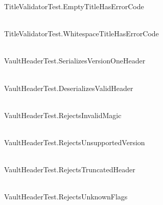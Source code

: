 \begin{DoxyRefList}
\label{test__test000028}%
%
Title\+Validator\+Test.\+Empty\+Title\+Has\+Error\+Code  
\item[{\parbox[t]{\linewidth}{Member \doxylink{_validation_error_test_8cpp_aa2a87c6ca1c63f442dc169d5cdd9415a}{TEST} (Title\+Validator\+Test, Whitespace\+Title\+Has\+Error\+Code)}}]\hfill \\
\label{test__test000029}%
%
Title\+Validator\+Test.\+Whitespace\+Title\+Has\+Error\+Code  
\item[{\parbox[t]{\linewidth}{Member \doxylink{_vault_header_test_8cpp_a066a86e7251b44f3d0ca70fdd046a58a}{TEST} (Vault\+Header\+Test, Serializes\+Version\+One\+Header)}}]\hfill \\
\label{test__test000030}%
%
Vault\+Header\+Test.\+Serializes\+Version\+One\+Header  
\item[{\parbox[t]{\linewidth}{Member \doxylink{_vault_header_test_8cpp_a98f85a77e3f67e42075fa7940898a537}{TEST} (Vault\+Header\+Test, Deserializes\+Valid\+Header)}}]\hfill \\
\label{test__test000031}%
%
Vault\+Header\+Test.\+Deserializes\+Valid\+Header  
\item[{\parbox[t]{\linewidth}{Member \doxylink{_vault_header_test_8cpp_a7e25d12c59dc37adc670d0658acc3b3f}{TEST} (Vault\+Header\+Test, Rejects\+Invalid\+Magic)}}]\hfill \\
\label{test__test000032}%
%
Vault\+Header\+Test.\+Rejects\+Invalid\+Magic  
\item[{\parbox[t]{\linewidth}{Member \doxylink{_vault_header_test_8cpp_a090221df618a7c0c7b2cacbb9aee4c56}{TEST} (Vault\+Header\+Test, Rejects\+Unsupported\+Version)}}]\hfill \\
\label{test__test000033}%
%
Vault\+Header\+Test.\+Rejects\+Unsupported\+Version  
\item[{\parbox[t]{\linewidth}{Member \doxylink{_vault_header_test_8cpp_a69d8aaa75875ef23884c67ba61339e60}{TEST} (Vault\+Header\+Test, Rejects\+Truncated\+Header)}}]\hfill \\
\label{test__test000034}%
%
Vault\+Header\+Test.\+Rejects\+Truncated\+Header  
\item[{\parbox[t]{\linewidth}{Member \doxylink{_vault_header_test_8cpp_ad98a66366e28ecf83a3972e3af57b89f}{TEST} (Vault\+Header\+Test, Rejects\+Unknown\+Flags)}}]\hfill \\
\label{test__test000035}%
%
Vault\+Header\+Test.\+Rejects\+Unknown\+Flags 
\end{DoxyRefList}
